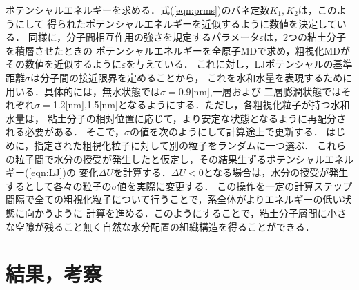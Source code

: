 ﻿\documentclass[11pt,a4j]{jarticle}
\begin{document}
ポテンシャルエネルギーを求める．式(\ref{eqn:prms})のバネ定数$K_1, K_2$は，このようにして
得られたポテンシャルエネルギーを近似するように数値を決定している．
同様に，分子間相互作用の強さを規定するパラメータ$\varepsilon$は，2つの粘土分子を積層させたときの
ポテンシャルエネルギーを全原子MDで求め，粗視化MDがその数値を近似するように$\varepsilon$を与えている．
これに対し，LJポテンシャルの基準距離$\sigma$は分子間の接近限界を定めることから，
これを水和水量を表現するために用いる．具体的には，無水状態では$\sigma=$0.9[nm],一層および
二層膨潤状態ではそれぞれ$\sigma=$1.2[nm],1.5[nm]となるようにする．ただし，各粗視化粒子が持つ水和水量は，
粘土分子の相対位置に応じて，より安定な状態となるように再配分される必要がある．
そこで，$\sigma$の値を次のようにして計算途上で更新する．
はじめに，指定された粗視化粒子に対して別の粒子をランダムに一つ選ぶ．
これらの粒子間で水分の授受が発生したと仮定し，その結果生ずるポテンシャルエネルギー(\ref{eqn:LJ})の
変化$\Delta U$を計算する．$\Delta U<0$となる場合は，水分の授受が発生するとして各々の粒子の$\sigma$値を実際に変更する．
この操作を一定の計算ステップ間隔で全ての粗視化粒子について行うことで，系全体がよりエネルギーの低い状態に向かうように
計算を進める．このようにすることで，粘土分子層間に小さな空隙が残ること無く自然な水分配置の組織構造を得ることができる．
\section{結果，考察}
\end{document}
